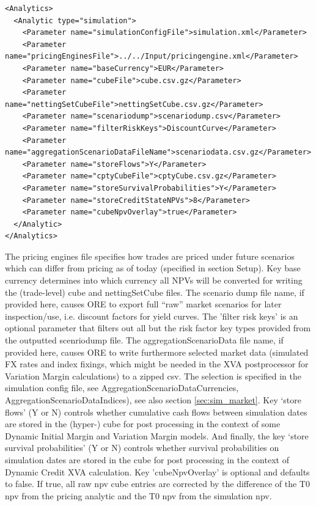 \begin{listing}[H]
\begin{verbatim}
<Analytics>
  <Analytic type="simulation">
    <Parameter name="simulationConfigFile">simulation.xml</Parameter>
    <Parameter name="pricingEnginesFile">../../Input/pricingengine.xml</Parameter>
    <Parameter name="baseCurrency">EUR</Parameter>
    <Parameter name="cubeFile">cube.csv.gz</Parameter>
    <Parameter name="nettingSetCubeFile">nettingSetCube.csv.gz</Parameter>
    <Parameter name="scenariodump">scenariodump.csv</Parameter>
    <Parameter name="filterRiskKeys">DiscountCurve</Parameter>
    <Parameter name="aggregationScenarioDataFileName">scenariodata.csv.gz</Parameter>
    <Parameter name="storeFlows">Y</Parameter>
    <Parameter name="cptyCubeFile">cptyCube.csv.gz</Parameter>
    <Parameter name="storeSurvivalProbabilities">Y</Parameter>
    <Parameter name="storeCreditStateNPVs">8</Parameter>
    <Parameter name="cubeNpvOverlay">true</Parameter>
  </Analytic>
</Analytics>
\end{verbatim}
\caption{ORE analytic: simulation}
\label{lst:ore_simulation}
\end{listing}

The pricing engines file specifies how trades are priced under future scenarios which can differ from pricing as of
today (specified in section Setup).  Key base currency determines into which currency all NPVs will be converted for
writing the (trade-level) cube and nettingSetCube files.
The scenario dump file name, if provided here, causes ORE to export full ``raw'' market scenarios for later inspection/use,
i.e. discount factors for yield curves.
The 'filter risk keys' is an optional parameter that filters out all but the risk factor key types provided from the outputted scenriodump file.
The aggregationScenarioData file name, if provided here, causes ORE to write furthermore selected market data (simulated
FX rates and index fixings, which might be needed in the XVA postprocessor for Variation Margin calculations) to a zipped csv.
The selection is specified in the simulation config file, see AggregationScenarioDataCurrencies, AggregationScenarioDataIndices),
see also section \ref{sec:sim_market}.
Key `store flows' (Y or N) controls whether cumulative cash flows between simulation dates are stored in the (hyper-)
cube for post processing in the context of some Dynamic Initial Margin and Variation Margin models. And finally, the
key `store survival probabilities' (Y or N) controls whether survival probabilities on simulation dates are stored in the
cube for post processing in the context of Dynamic Credit XVA calculation.
Key 'cubeNpvOverlay' is optional and defaults to false. If true, all raw npv cube entries are corrected by the
difference of the T0 npv from the pricing analytic and the T0 npv from the simulation npv.

